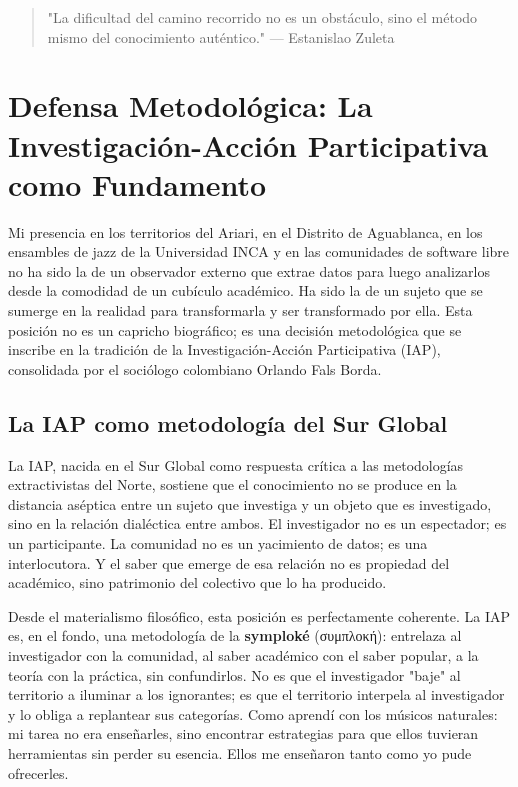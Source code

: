 \documentclass[14pt, a4paper]{article}
\begin{document}
\begin{quote}
"La dificultad del camino recorrido no es un obstáculo, sino el método
mismo del conocimiento auténtico."
— Estanislao Zuleta
\end{quote}
\section{Defensa Metodológica: La Investigación-Acción Participativa como Fundamento}
\label{defensa-metodologica}
Mi presencia en los territorios del Ariari, en el Distrito de
Aguablanca, en los ensambles de jazz de la Universidad INCA y en las
comunidades de software libre no ha sido la de un observador externo
que extrae datos para luego analizarlos desde la comodidad de un
cubículo académico. Ha sido la de un sujeto que se sumerge en la
realidad para transformarla y ser transformado por ella. Esta
posición no es un capricho biográfico; es una decisión metodológica
que se inscribe en la tradición de la Investigación-Acción
Participativa (IAP), consolidada por el sociólogo colombiano Orlando
Fals Borda.
\subsection{La IAP como metodología del Sur Global}
\label{iap-sur-global}
La IAP, nacida en el Sur Global como respuesta crítica a las
metodologías extractivistas del Norte, sostiene que el conocimiento
no se produce en la distancia aséptica entre un sujeto que investiga
y un objeto que es investigado, sino en la relación dialéctica entre
ambos. El investigador no es un espectador; es un participante. La
comunidad no es un yacimiento de datos; es una interlocutora. Y el
saber que emerge de esa relación no es propiedad del académico, sino
patrimonio del colectivo que lo ha producido.

Desde el materialismo filosófico, esta posición es perfectamente
coherente. La IAP es, en el fondo, una metodología de la \textbf{symploké}
(συμπλοκή): entrelaza al investigador con la comunidad, al saber
académico con el saber popular, a la teoría con la práctica, sin
confundirlos. No es que el investigador "baje" al territorio a
iluminar a los ignorantes; es que el territorio interpela al
investigador y lo obliga a replantear sus categorías. Como aprendí
con los músicos naturales: mi tarea no era enseñarles, sino encontrar
estrategias para que ellos tuvieran herramientas sin perder su
esencia. Ellos me enseñaron tanto como yo pude ofrecerles.
\end{document}
